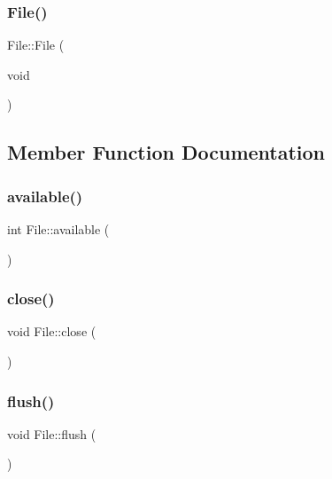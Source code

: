 \subsubsection{\texorpdfstring{File()}{File()}\hspace{0.1cm}{\footnotesize\ttfamily [2/2]}}
{\footnotesize\ttfamily File\+::\+File (\begin{DoxyParamCaption}\item[{void}]{ }\end{DoxyParamCaption})}



\subsection{Member Function Documentation}
\mbox{\label{class_s_d_lib_1_1_file_acf613c4e75bae85f543b30e701ebcc44}} 
\subsubsection{\texorpdfstring{available()}{available()}}
{\footnotesize\ttfamily int File\+::available (\begin{DoxyParamCaption}{ }\end{DoxyParamCaption})\hspace{0.3cm}{\ttfamily [virtual]}}

\mbox{\label{class_s_d_lib_1_1_file_a83cbce54d6c3b8c2f417b51f6b3f488c}} 
\subsubsection{\texorpdfstring{close()}{close()}}
{\footnotesize\ttfamily void File\+::close (\begin{DoxyParamCaption}{ }\end{DoxyParamCaption})}

\mbox{\label{class_s_d_lib_1_1_file_af87fa862de707575b8badd044a5af80e}} 
\subsubsection{\texorpdfstring{flush()}{flush()}}
{\footnotesize\ttfamily void File\+::flush (\begin{DoxyParamCaption}{ }\end{DoxyParamCaption})\hspace{0.3cm}{\ttfamily [virtual]}}

